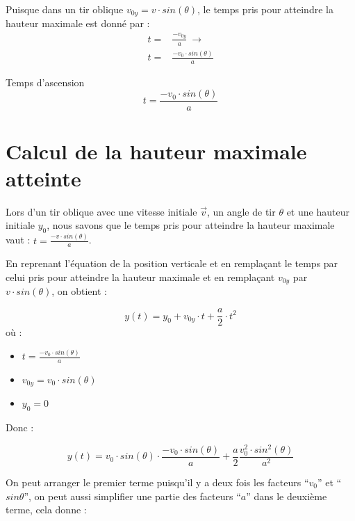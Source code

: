 Puisque dans un tir oblique \(v_{0y}=v \cdot sin(\theta)\), le temps pris pour atteindre la hauteur maximale est donné par :
\begin{align}
    t = & \frac{-v_{0y}}{a} \ \rightarrow  \\
    t = & \frac{-v_0 \cdot sin(\theta)}{a}
\end{align}

\begin{encadre_equation*}{Temps d'ascension}
    \begin{equation}
        t = \frac{-v_0 \cdot sin(\theta)}{a}
    \end{equation}
\end{encadre_equation*}

\newpage

\section{Calcul de la hauteur maximale atteinte}
Lors d'un tir oblique avec une vitesse initiale \(\vec{v}\), un angle de tir \(\theta\) et une hauteur initiale \(y_0\), nous savons que le temps pris pour atteindre la hauteur maximale vaut : \(t=\frac{-v \cdot sin(\theta)}{a}\).

En reprenant l'équation de la position verticale et en remplaçant le temps par celui pris pour atteindre la hauteur maximale et en remplaçant \(v_{0y}\) par \(v \cdot sin(\theta)\), on obtient :

\begin{equation}
    y(t)=y_0 + v_{0y} \cdot t + \frac{a}{2} \cdot t^2
\end{equation} où :

\begin{itemize}[label=\textbullet]
    \item \(t=\frac{-v_0 \cdot sin(\theta)}{a}\)
    \item \(v_{0y}=v_0 \cdot sin(\theta)\)
    \item \(y_0=0\)
\end{itemize}

Donc :

\begin{equation}
    y(t)=v_0 \cdot sin(\theta) \cdot \frac{-v_0 \cdot sin(\theta)}{a} + \frac{a}{2} \frac{v_0^2 \cdot sin^2(\theta)}{a^2}
\end{equation}

On peut arranger le premier terme puisqu'il y a deux fois les facteurs \enquote{\(v_0\)} et \enquote{\(sin \theta\)}, on peut aussi simplifier une partie des facteurs \enquote{\(a\)} dans le deuxième terme, cela donne :

